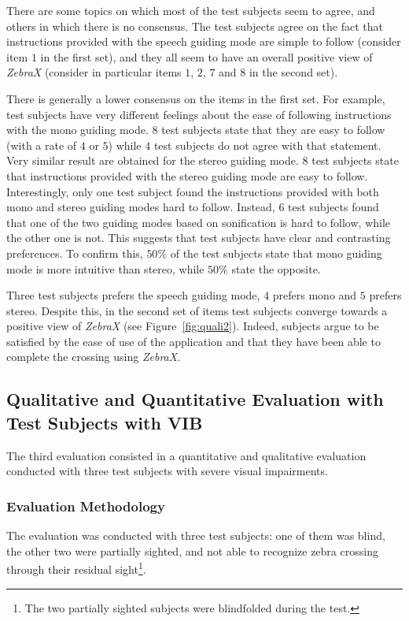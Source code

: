\documentclass{article}
\newcommand{\zebra}{\emph{ZebraX}}
\begin{document}
There are some topics on which most of the test subjects seem to agree, and others in which there is no consensus.
The test subjects agree on the fact that instructions provided with the speech guiding mode are simple to follow (consider item $1$ in the first set), and they all seem to have an overall positive view of \zebra{} (consider in particular items $1$, $2$, $7$ and $8$ in the second set).

There is generally a lower consensus on the items in the first set. For example, test subjects have very different feelings about the ease of following instructions with the mono guiding mode. $8$ test subjects state that they are easy to follow (with a rate of $4$ or $5$) while $4$ test subjects do not agree with that statement.
Very similar result are obtained for the stereo guiding mode. $8$ test subjects state that instructions provided with the stereo guiding mode are easy to follow.
Interestingly, only one test subject found the instructions provided with both mono and stereo guiding modes hard to follow. Instead, $6$ test subjects found that one of the two guiding modes based on sonification is hard to follow, while the other one is not. This suggests that test subjects have clear and contrasting preferences. To confirm this, $50\%$ of the test subjects state that mono guiding mode is more intuitive than stereo, while $50\%$ state the opposite.

Three test subjects prefers the speech guiding mode, $4$ prefers mono and $5$ prefers stereo.
Despite this, in the second set of items test subjects converge towards a positive view of \zebra{} (see Figure~\ref{fig:quali2}).
Indeed, subjects argue to be satisfied by the ease of use of the application and that they have been able to complete the crossing using \zebra{}.

\subsection{Qualitative and Quantitative Evaluation with Test Subjects with VIB}
\label{sub:quantiquali}
The third evaluation consisted in a quantitative and qualitative evaluation conducted with three test subjects with severe visual impairments.

\subsubsection{Evaluation Methodology}
The evaluation was conducted with three test subjects: one of them was blind, the other two were partially sighted, and not able to recognize zebra crossing through their residual sight\footnote{The two partially sighted subjects were blindfolded during the test.}.
\end{document}
